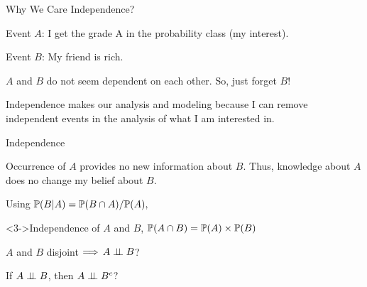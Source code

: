 \documentclass[fleqn,aspectratio=169]{beamer}
\begin{document}
\begin{frame}{Why We Care Independence?}

\plitemsep 0.1in
\bci 

\item<2-> Event $A$: I get the grade A in the probability class (my interest).
\item<2-> Event $B$: My friend is rich. 

\bigskip
\item<3-> $A$ and $B$ do not seem dependent on each other. So, just forget $B$!

\item<4-> Independence makes our analysis and modeling  because I can remove independent events in the analysis of what I am interested in.  
\eci 
\end{frame}


\begin{frame}{Independence}

\plitemsep 0.05in
\bci 

\item<1-> Occurrence of $A$ provides no new information about $B.$ Thus, knowledge about $A$ does no change my belief about $B.$ 

\item Using $\mathbb{P}( B | A ) = \mathbb{P}( B \cap A )/\mathbb{P}( A ),$ 

\begin{block}<3->{Independence of $A$ and $B$, }
$\mathbb{P}( A \cap B ) = \mathbb{P}( A ) \times \mathbb{P}( B )$
\end{block}

\item<5->  $A$ and $B$ disjoint $\Longrightarrow$ $A \perp \!\!\! \perp B$?


\item<7->  If $A \perp \!\!\! \perp B$,  then $A \perp \!\!\! \perp B^c$?  
\eci 
\end{frame}
\end{document}
